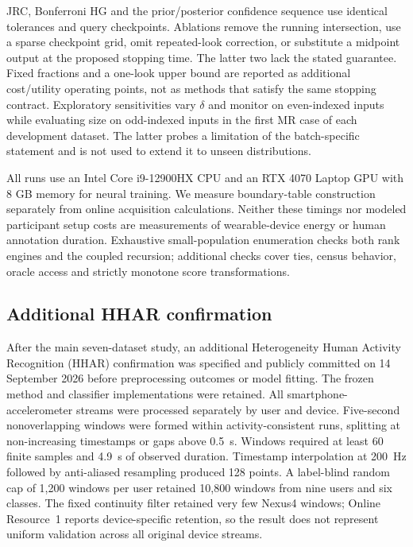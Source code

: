 \documentclass[pdflatex,sn-basic,Numbered,iicol]{sn-jnl}
\begin{document}
JRC, Bonferroni HG and the prior/posterior confidence sequence use identical tolerances and query checkpoints. Ablations remove the running intersection, use a sparse checkpoint grid, omit repeated-look correction, or substitute a midpoint output at the proposed stopping time. The latter two lack the stated guarantee. Fixed fractions and a one-look upper bound are reported as additional cost/utility operating points, not as methods that satisfy the same stopping contract. Exploratory sensitivities vary $\delta$ and monitor on even-indexed inputs while evaluating size on odd-indexed inputs in the first MR case of each development dataset. The latter probes a limitation of the batch-specific statement and is not used to extend it to unseen distributions.

All runs use an Intel Core i9-12900HX CPU and an RTX 4070 Laptop GPU with 8 GB memory for neural training. We measure boundary-table construction separately from online acquisition calculations. Neither these timings nor modeled participant setup costs are measurements of wearable-device energy or human annotation duration. Exhaustive small-population enumeration checks both rank engines and the coupled recursion; additional checks cover ties, census behavior, oracle access and strictly monotone score transformations.



\subsection{Additional HHAR confirmation}
After the main seven-dataset study, an additional Heterogeneity Human Activity Recognition (HHAR) confirmation \cite{hhar} was specified and publicly committed on 14 September 2026 before preprocessing outcomes or model fitting. The frozen method and classifier implementations were retained. All smartphone-accelerometer streams were processed separately by user and device. Five-second nonoverlapping windows were formed within activity-consistent runs, splitting at non-increasing timestamps or gaps above 0.5~s. Windows required at least 60 finite samples and 4.9~s of observed duration. Timestamp interpolation at 200~Hz followed by anti-aliased resampling produced 128 points. A label-blind random cap of 1,200 windows per user retained 10,800 windows from nine users and six classes. The fixed continuity filter retained very few Nexus4 windows; Online Resource~1 reports device-specific retention, so the result does not represent uniform validation across all original device streams.
\end{document}
